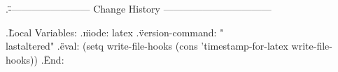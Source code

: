 \newpage
{}


\makeatletter
{}
\makeatother



.\" ------------------------- Change History ---------------------------------

.\" Local Variables:
.\" mode: latex
.\" version-command: "\\lastaltered"
.\" eval: (setq write-file-hooks (cons 'timestamp-for-latex write-file-hooks))
.\" End:


